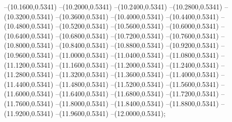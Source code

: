 {	--(10.1600,0.5341)
	--(10.2000,0.5341)
	--(10.2400,0.5341)
	--(10.2800,0.5341)
	--(10.3200,0.5341)
	--(10.3600,0.5341)
	--(10.4000,0.5341)
	--(10.4400,0.5341)
	--(10.4800,0.5341)
	--(10.5200,0.5341)
	--(10.5600,0.5341)
	--(10.6000,0.5341)
	--(10.6400,0.5341)
	--(10.6800,0.5341)
	--(10.7200,0.5341)
	--(10.7600,0.5341)
	--(10.8000,0.5341)
	--(10.8400,0.5341)
	--(10.8800,0.5341)
	--(10.9200,0.5341)
	--(10.9600,0.5341)
	--(11.0000,0.5341)
	--(11.0400,0.5341)
	--(11.0800,0.5341)
	--(11.1200,0.5341)
	--(11.1600,0.5341)
	--(11.2000,0.5341)
	--(11.2400,0.5341)
	--(11.2800,0.5341)
	--(11.3200,0.5341)
	--(11.3600,0.5341)
	--(11.4000,0.5341)
	--(11.4400,0.5341)
	--(11.4800,0.5341)
	--(11.5200,0.5341)
	--(11.5600,0.5341)
	--(11.6000,0.5341)
	--(11.6400,0.5341)
	--(11.6800,0.5341)
	--(11.7200,0.5341)
	--(11.7600,0.5341)
	--(11.8000,0.5341)
	--(11.8400,0.5341)
	--(11.8800,0.5341)
	--(11.9200,0.5341)
	--(11.9600,0.5341)
	--(12.0000,0.5341);
}
